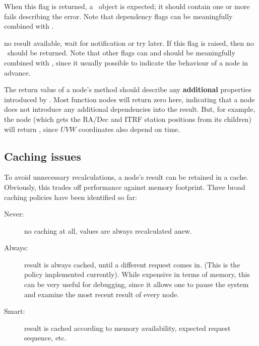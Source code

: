 \documentclass[10pt]{article}
\begin{document}
\begin{description}
    When this flag is returned, a \Result\ object is expected; it should
    contain one or more fails describing the error. Note that dependency flags
    can be meaningfully combined with .

  \item[\RES{WAIT}:] no result available, wait for notification or try later.
    If this flag is raised, then no \Result\ should be returned. Note that
    other flags can and should be meaningfully combined with , since
    it usually possible to indicate the behaviour of a node in advance.
    
  \end{description}
  
  The return value of a node's  method should describe any {\bf
  additional} properties introduced by . Most function nodes
  will return zero here, indicating that a node does not introduce any
  additional dependencies into the result. But, for example, the  node
  (which gets the RA/Dec and ITRF station positions from its children) will
  return , since $UVW$ coordinates also depend on time.

\subsection{Caching issues}

  To avoid unnecessary recalculations, a node's result can be retained in a
  cache. Obviously, this trades off performance against memory footprint. Three
  broad caching policies have been identified so far:

  \begin{description}
  
  \item[Never:] no caching at all, values are always recalculated anew. 
   
  \item[Always:] result is always cached, until a different request comes in.
    (This is the policy implemented currently). While expensive in terms of
    memory, this can be very useful for debugging, since it allows one to pause
    the system and examine the most recent result of every node.

  \item[Smart:] result is cached according to memory availability, expected
    request sequence, etc.

  \end{description}
  
\end{document}
